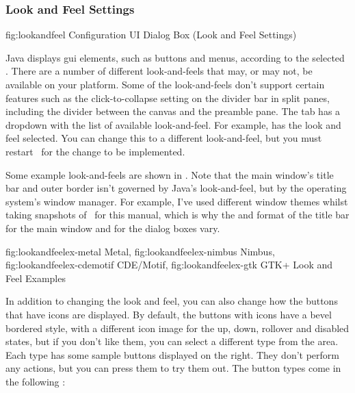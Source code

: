 
\subsubsection{Look and Feel Settings}\label{sec:lookandfeel}


\FloatFig
  {fig:lookandfeel}
  {}
  {Configuration UI Dialog Box (Look and Feel Settings)}

Java displays \gls{gui} elements, such as buttons and menus,
according to the selected . There are a number of
different \glspl{look-and-feel} that may, or may not, be available on your
platform. Some of the \glspl{look-and-feel} don't support certain features
such as the click-to-collapse setting on the divider bar in split
panes, including the divider between the \gls{canvas} and the preamble
pane. The  tab has a
\gls{dropdown} with the list of available \gls{look-and-feel}. For
example,  has the  look and
feel selected. You can change this to a different \gls{look-and-feel}, but
you must restart \FlowframTk\ for the change to be implemented.

Some example \glspl{look-and-feel} are shown in .
Note that the main window's title bar and outer border isn't
governed by Java's \gls{look-and-feel}, but by the operating
system's window manager. For example, I've used different window
themes whilst taking snapshots of \FlowframTk\ for this manual,
which is why the  and format of the title bar for the main
window and for the dialog boxes vary.

{
  {fig:lookandfeelex-metal}
    {}{Metal},
  {fig:lookandfeelex-nimbus}
    {}{Nimbus},
  {fig:lookandfeelex-cdemotif}
    {}{CDE\slash Motif},
  {fig:lookandfeelex-gtk}
    {}{GTK+}
}
{Look and Feel Examples}

In addition to changing the look and feel, you can also change how
the buttons that have icons are displayed. By default, the buttons
with icons have a bevel bordered style, with a different icon image for
the up, down, rollover and disabled states, but if you don't like
them, you can select a different type from the
 area. Each type has some sample
buttons displayed on the right. They don't perform any actions, but
you can press them to try them out. The button types come in the
following :

